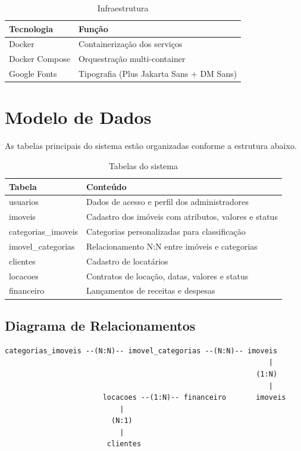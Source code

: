 \documentclass[12pt, a4paper]{article}
\newcommand{\thead}[1]{\cellcolor{tableheader}\color{white}\bfseries #1}
\newcommand{\talt}{\rowcolor{tablerowalt}}
\begin{document}
\begin{table}[H]
\centering
\begin{tabularx}{\textwidth}{|l|X|}
\hline
\thead{Tecnologia} & \thead{Função} \\
\hline
Docker         & Containerização dos serviços \\
\talt Docker Compose & Orquestração multi-container \\
Google Fonts   & Tipografia (Plus Jakarta Sans + DM Sans) \\
\hline
\end{tabularx}
\caption{Infraestrutura}
\end{table}

\section{Modelo de Dados}

As tabelas principais do sistema estão organizadas conforme a estrutura abaixo.

\begin{table}[H]
\centering
\begin{tabularx}{\textwidth}{|l|X|}
\hline
\thead{Tabela} & \thead{Conteúdo} \\
\hline
usuarios            & Dados de acesso e perfil dos administradores \\
\talt imoveis            & Cadastro dos imóveis com atributos, valores e status \\
categorias\_imoveis & Categorias personalizadas para classificação \\
\talt imovel\_categorias & Relacionamento N:N entre imóveis e categorias \\
clientes            & Cadastro de locatários \\
\talt locacoes           & Contratos de locação, datas, valores e status \\
financeiro          & Lançamentos de receitas e despesas \\
\hline
\end{tabularx}
\caption{Tabelas do sistema}
\end{table}

\subsection{Diagrama de Relacionamentos}

\begin{lstlisting}
categorias_imoveis --(N:N)-- imovel_categorias --(N:N)-- imoveis
                                                              |
                                                           (1:N)
                                                              |
                       locacoes --(1:N)-- financeiro       imoveis
                           |
                         (N:1)
                           |
                        clientes
\end{lstlisting}
\end{document}
